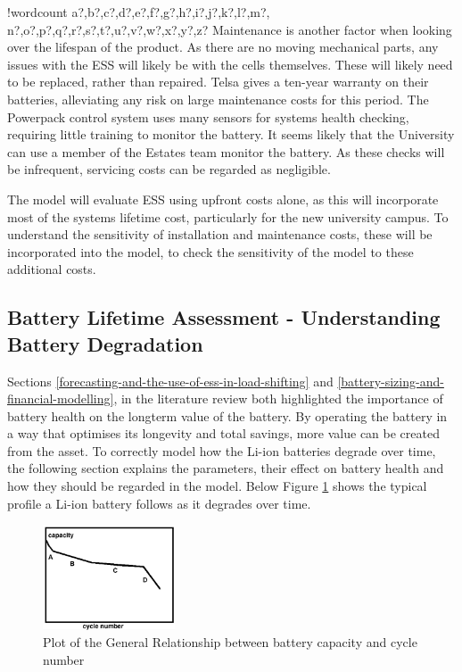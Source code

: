 \documentclass[fontsize=9.5pt]{extarticle}
\numberwithin{figure}{section} %
\newcounter{words}
\newenvironment{counted}{%
  \setcounter{words}{0}
  \SearchList!{wordcount}{\stepcounter{words}}
    {a?,b?,c?,d?,e?,f?,g?,h?,i?,j?,k?,l?,m?,
    n?,o?,p?,q?,r?,s?,t?,u?,v?,w?,x?,y?,z?}
  \UndoBoundary{'}
  \SearchOrder{p;}}{%
  \StopSearching}
\begin{document}
\begin{counted}
Maintenance is another factor when looking over the lifespan of the
product. As there are no moving mechanical parts, any issues with the
ESS will likely be with the cells themselves. These will likely need to
be replaced, rather than repaired. Telsa gives a ten-year warranty on
their batteries, alleviating any risk on large maintenance costs for
this period. The Powerpack control system uses many sensors for systems
health checking, requiring little training to monitor the battery. It
seems likely that the University can use a member of the Estates team
monitor the battery. As these checks will be infrequent, servicing costs
can be regarded as negligible.

The model will evaluate ESS using upfront costs alone, as this will
incorporate most of the systems lifetime cost, particularly for the new
university campus. To understand the sensitivity of installation and
maintenance costs, these will be incorporated into the model, to check
the sensitivity of the model to these additional costs.

\subsection{Battery Lifetime Assessment - Understanding Battery
Degradation}\label{battery-lifetime-assessment---understanding-battery-degradation}

Sections \ref{forecasting-and-the-use-of-ess-in-load-shifting} and
\ref{battery-sizing-and-financial-modelling}, in the literature review
both highlighted the importance of battery health on the longterm value
of the battery. By operating the battery in a way that optimises its
longevity and total savings, more value can be created from the asset.
To correctly model how the Li-ion batteries degrade over time, the
following section explains the parameters, their effect on battery
health and how they should be regarded in the model. Below Figure
\ref{batCapGen} shows the typical profile a Li-ion battery follows as it
degrades over time.

\begin{figure}[H]
  \centering
  \includegraphics[trim = 0 0 0 0, clip, width=0.35\textwidth]{batCapGen.png}
  \caption{Plot of the General Relationship between battery capacity and cycle number \cite{spotnitz2003simulation} }
  \label{batCapGen}
\end{figure}


\end{counted}
\end{document}
